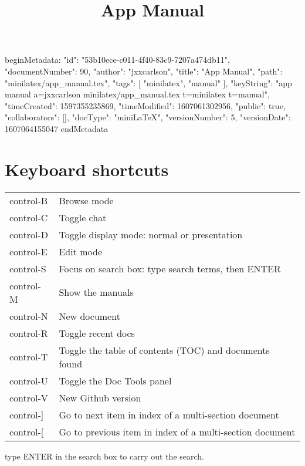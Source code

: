beginMetadata:
{
    "id": "53b10ece-c011-4f40-83c9-7207a474db11",
    "documentNumber": 90,
    "author": "jxxcarlson",
    "title": "App Manual",
    "path": "minilatex/app_manual.tex",
    "tags": [
        "minilatex",
        "manual"
    ],
    "keyString": "app manual a=jxxcarlson minilatex/app_manual.tex t=minilatex t=manual",
    "timeCreated": 1597355235869,
    "timeModified": 1607061302956,
    "public": true,
    "collaborators": [],
    "docType": "miniLaTeX",
    "versionNumber": 5,
    "versionDate": 1607064155047
}
endMetadata

\title{App Manual}

\maketitle

\tableofcontents

\section{Keyboard shortcuts}


\begin{indent}
\begin{tabular}{ll}
control-B & Browse mode \\
control-C & Toggle chat \\
control-D & Toggle display mode: normal or presentation \\
control-E & Edit mode \\
control-S & Focus on search box: type search terms, then ENTER \\
control-M & Show the manuals \\
control-N & New document \\
control-R & Toggle recent docs \\
control-T & Toggle the table of contents (TOC) and documents found \\
control-U & Toggle the Doc Tools panel \\
control-V & New Github version \\
control-] & Go to next item in index of a multi-section document\\
control-[ & Go to previous item in index of a multi-section document \\
\end{tabular}
\end{indent}

 type ENTER in the search box to carry out the search.  

